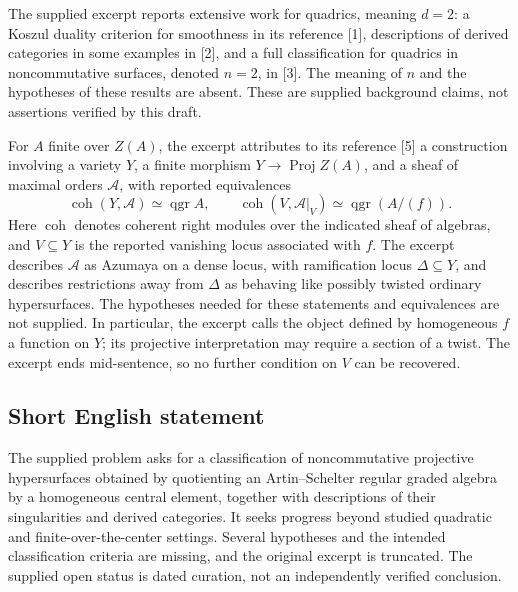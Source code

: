 \documentclass[11pt]{article}
\begin{document}
The supplied excerpt reports extensive work for quadrics, meaning \(d=2\): a Koszul duality criterion for smoothness in its reference [1], descriptions of derived categories in some examples in [2], and a full classification for quadrics in noncommutative surfaces, denoted \(n=2\), in [3]. The meaning of \(n\) and the hypotheses of these results are absent. These are supplied background claims, not assertions verified by this draft.

For \(A\) finite over \(Z(A)\), the excerpt attributes to its reference [5] a construction involving a variety \(Y\), a finite morphism \(Y\to\operatorname{Proj}Z(A)\), and a sheaf of maximal orders \(\mathcal A\), with reported equivalences
\[
\operatorname{coh}(Y,\mathcal A)\simeq\operatorname{qgr}A,
\qquad
\operatorname{coh}(V,\mathcal A|_V)\simeq\operatorname{qgr}(A/(f)).
\]
Here \(\operatorname{coh}\) denotes coherent right modules over the indicated sheaf of algebras, and \(V\subseteq Y\) is the reported vanishing locus associated with \(f\). The excerpt describes \(\mathcal A\) as Azumaya on a dense locus, with ramification locus \(\Delta\subseteq Y\), and describes restrictions away from \(\Delta\) as behaving like possibly twisted ordinary hypersurfaces. The hypotheses needed for these statements and equivalences are not supplied. In particular, the excerpt calls the object defined by homogeneous \(f\) a function on \(Y\); its projective interpretation may require a section of a twist. The excerpt ends mid-sentence, so no further condition on \(V\) can be recovered.
\subsection{Short English statement}
The supplied problem asks for a classification of noncommutative projective hypersurfaces obtained by quotienting an Artin--Schelter regular graded algebra by a homogeneous central element, together with descriptions of their singularities and derived categories. It seeks progress beyond studied quadratic and finite-over-the-center settings. Several hypotheses and the intended classification criteria are missing, and the original excerpt is truncated. The supplied open status is dated curation, not an independently verified conclusion.
\end{document}
